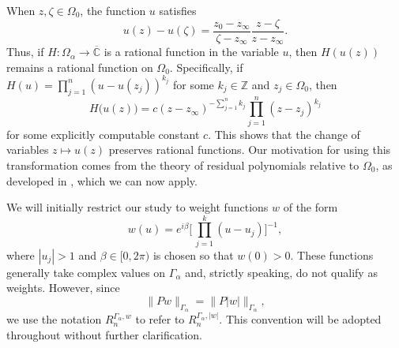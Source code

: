 \documentclass[12pt,oneside,reqno]{amsart}
\theoremstyle{definition}
\numberwithin{equation}{section}
\newcommand{\Z}{{\mathbb Z}}
\newcommand{\C}{{\mathbb C}}
\newcommand{\RS}{\overline{\C}}
\begin{document}
\begin{center}
\end{center}


When $z,\zeta\in \Omega_0$, the function $u$ satisfies
\begin{equation}
		u(z)-u(\zeta) = \frac{z_0-z_\infty}{\zeta-z_\infty}\frac{z-\zeta}{z-z_\infty}.
		\label{eq:change_of_variables}
\end{equation}
Thus, if $H:\Omega_\alpha\rightarrow \RS$ is a rational function in the variable $u$, then $H(u(z))$ remains a rational function on $\Omega_0$. Specifically, if $H(u) = \prod_{j=1}^{n}(u-u(z_j))^{k_j}$ for some $k_j\in \Z$ and $z_j\in\Omega_0$, then
\begin{equation}
	H\bigl(u(z)\bigr)=c (z-z_\infty)^{-\sum_{j=1}^{n}k_j} \prod_{j=1}^{n}(z-z_j)^{k_j}
	\label{eq:rational_funct_transform}
\end{equation}
for some explicitly computable constant $c$.
This shows that the change of variables $z\mapsto u(z)$ preserves rational functions. 
Our motivation for using this transformation comes from the theory of residual polynomials relative to $\Omega_0$, as developed in \cite{yuditskii99}, which we can now apply.

We will initially restrict our study to weight functions $w$ of the form
\begin{equation}
	w(u) = e^{i\beta}\Biggl[\,\prod_{j=1}^{k}(u-u_j)\Biggr]^{-1},
	\label{eq:weight_function_form}
\end{equation}
where $|u_j|> 1$ and $\beta\in [0,2\pi)$ is chosen so that $w(0)>0$. These functions generally take complex values on $\Gamma_\alpha$ and, strictly speaking, do not qualify as weights. However, since \[\|Pw\|_{\Gamma_\alpha} = \|P|w|\|_{\Gamma_\alpha},\] we use the notation $R_n^{\Gamma_\alpha,w}$ to refer to $R_n^{\Gamma_\alpha, |w|}$. This convention will be adopted throughout without further clarification.
\end{document}
